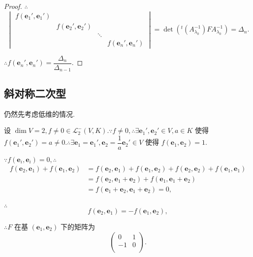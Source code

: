 \documentclass{ctexart}
\begin{document}
\begin{proof}
    $\therefore$
    \[\begin{vmatrix}
        f(\boldsymbol{e}_1',\boldsymbol{e}_1') \\
        & f(\boldsymbol{e}_2',\boldsymbol{e}_2') \\
        && \ddots \\
        &&& f(\boldsymbol{e}_n',\boldsymbol{e}_n')
    \end{vmatrix}=\det({}^t(A_{\lambda_0}^{-1})FA_{\lambda_0}^{-1})=\Delta_n.\]

    $\therefore f(\boldsymbol{e}_n',\boldsymbol{e}_n')=\dfrac{\Delta_n}{\Delta_{n-1}}$.
\end{proof}
\subsection{斜对称二次型}
仍然先考虑低维的情况.

设 $\dim V=2,f\neq0\in\mathcal{L}_2^-(V,K).\because f\neq0,\therefore\exists\boldsymbol{e}_1',\boldsymbol{e}_2'\in V,a\in K$ 使得 $f(\boldsymbol{e}_1',\boldsymbol{e}_2')=a\neq0.\therefore\exists\boldsymbol{e}_1=\boldsymbol{e}_1',\boldsymbol{e}_2=\dfrac{1}{a}\boldsymbol{e}_2'\in V$ 使得 $f(\boldsymbol{e}_1,\boldsymbol{e}_2)=1$.

$\because f(\boldsymbol{e}_i,\boldsymbol{e}_i)=0,\therefore$
\begin{align*}
    f(\boldsymbol{e}_2,\boldsymbol{e}_1)+f(\boldsymbol{e}_1,\boldsymbol{e}_2) & =f(\boldsymbol{e}_2,\boldsymbol{e}_1)+f(\boldsymbol{e}_1,\boldsymbol{e}_2)+f(\boldsymbol{e}_2,\boldsymbol{e}_2)+f(\boldsymbol{e}_1,\boldsymbol{e}_1) \\
    & =f(\boldsymbol{e}_2,\boldsymbol{e}_1+\boldsymbol{e}_2)+f(\boldsymbol{e}_1,\boldsymbol{e}_1+\boldsymbol{e}_2) \\
    & =f(\boldsymbol{e}_1+\boldsymbol{e}_2,\boldsymbol{e}_1+\boldsymbol{e}_2)=0, \\
\end{align*}

$\therefore$
\[f(\boldsymbol{e}_2,\boldsymbol{e}_1)=-f(\boldsymbol{e}_1,\boldsymbol{e}_2),\]

$\therefore F$ 在基 $(\boldsymbol{e}_1,\boldsymbol{e}_2)$ 下的矩阵为
\[\begin{pmatrix}
    0 & 1 \\
    -1 & 0 \\
\end{pmatrix}.\]
\end{document}
